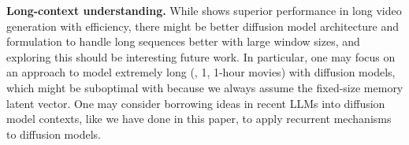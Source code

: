 \vspace{0.02in}
\noindent\textbf{Long-context understanding.}
While \sname shows superior performance in long video generation with efficiency, there might be better diffusion model architecture and formulation to handle long sequences better with large window sizes, and exploring this should be interesting future work. In particular, one may focus on an approach to model extremely long (\eg, 1, 1-hour movies) with diffusion models, which might be suboptimal with \sname because we always assume the fixed-size memory latent vector. One may consider borrowing ideas in recent LLMs into diffusion model contexts, like we have done in this paper, to apply recurrent mechanisms to diffusion models. 

